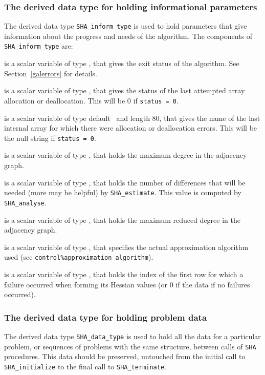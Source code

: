 \documentclass{galahad}
\newcommand{\packagename}{SHA}
\begin{document}

\subsubsection{The derived data type for holding informational
 parameters}\label{typeinform}
The derived data type
{\tt \packagename\_inform\_type}
is used to hold parameters that give information about the progress and needs
of the algorithm. The components of
{\tt \packagename\_inform\_type}
are:

\begin{description}
 is a scalar variable of type \integer, that gives the
exit status of the algorithm.
See Section~\ref{galerrors} for details.

 is a scalar variable of type \integer, that gives
the status of the last attempted array allocation or deallocation.
This will be 0 if {\tt status = 0}.

 is a scalar variable of type default \character\
and length 80, that  gives the name of the last internal array
for which there were allocation or deallocation errors.
This will be the null string if {\tt status = 0}.

 is a scalar variable of type \integer,
that holds the maximum degree in the adjacency graph.

 is a scalar variable of type \integer,
that holds the number of differences that will be needed (more may be helpful)
by {\tt \packagename\_\-estimate}. This value is computed by
{\tt \packagename\_\-analyse}.

 is a scalar variable of type \integer,
that holds the maximum reduced degree in the adjacency graph.

  is a scalar variable of type
\integer, that specifies the actual approximation algorithm used
(see {\tt control\%approximation\_algorithm}).

 is a scalar variable of type \integer, that holds the
index of the first row for which a failure occurred when forming its Hessian
values (or 0 if the data if no failures occurred).

\end{description}


\subsubsection{The derived data type for holding problem data}\label{typedata}
The derived data type
{\tt \packagename\_data\_type}
is used to hold all the data for a particular problem,
or sequences of problems with the same structure, between calls of
{\tt \packagename} procedures.
This data should be preserved, untouched from the initial call to
{\tt \packagename\_initialize}
to the final call to
{\tt \packagename\_terminate}.
\end{document}
